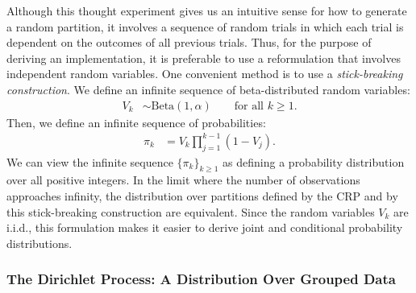 \documentclass{article}
\begin{document}
Although this thought experiment gives us an intuitive sense for how to generate a random partition, it involves a sequence of random trials in which each trial is dependent on the outcomes of all previous trials.
Thus, for the purpose of deriving an implementation, it is preferable to use a reformulation that involves independent random variables.
One convenient method is to use a \emph{stick-breaking construction}.
We define an infinite sequence of beta-distributed random variables:
\begin{align}
V_k &\sim \text{Beta}(1, \alpha) \qquad \text{for all $k \geq 1$}.
\end{align}
Then, we define an infinite sequence of probabilities:
\begin{align}
\pi_k &= V_k \prod_{j=1}^{k-1} (1-V_j).
\label{eq:pi_crp}
\end{align}
We can view the infinite sequence $\{\pi_k\}_{k \geq 1}$ as defining a probability distribution over all positive integers.
In the limit where the number of observations approaches infinity, the distribution over partitions defined by the CRP and by this stick-breaking construction are equivalent.
Since the random variables $V_k$ are i.i.d., this formulation makes it easier to derive joint and conditional probability distributions.

\subsubsection{The Dirichlet Process: A Distribution Over Grouped Data}
\end{document}

